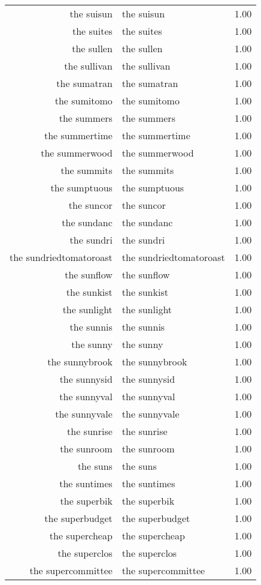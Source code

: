 \begin{table}[ht]
\begin{tabular}{rlr}
  the suisun & the suisun & 1.00 \\ 
  the suites & the suites & 1.00 \\ 
  the sullen & the sullen & 1.00 \\ 
  the sullivan & the sullivan & 1.00 \\ 
  the sumatran & the sumatran & 1.00 \\ 
  the sumitomo & the sumitomo & 1.00 \\ 
  the summers & the summers & 1.00 \\ 
  the summertime & the summertime & 1.00 \\ 
  the summerwood & the summerwood & 1.00 \\ 
  the summits & the summits & 1.00 \\ 
  the sumptuous & the sumptuous & 1.00 \\ 
  the suncor & the suncor & 1.00 \\ 
  the sundanc & the sundanc & 1.00 \\ 
  the sundri & the sundri & 1.00 \\ 
  the sundriedtomatoroast & the sundriedtomatoroast & 1.00 \\ 
  the sunflow & the sunflow & 1.00 \\ 
  the sunkist & the sunkist & 1.00 \\ 
  the sunlight & the sunlight & 1.00 \\ 
  the sunnis & the sunnis & 1.00 \\ 
  the sunny & the sunny & 1.00 \\ 
  the sunnybrook & the sunnybrook & 1.00 \\ 
  the sunnysid & the sunnysid & 1.00 \\ 
  the sunnyval & the sunnyval & 1.00 \\ 
  the sunnyvale & the sunnyvale & 1.00 \\ 
  the sunrise & the sunrise & 1.00 \\ 
  the sunroom & the sunroom & 1.00 \\ 
  the suns & the suns & 1.00 \\ 
  the suntimes & the suntimes & 1.00 \\ 
  the superbik & the superbik & 1.00 \\ 
  the superbudget & the superbudget & 1.00 \\ 
  the supercheap & the supercheap & 1.00 \\ 
  the superclos & the superclos & 1.00 \\ 
  the supercommittee & the supercommittee & 1.00 \\ 

\end{tabular}
\end{table}
